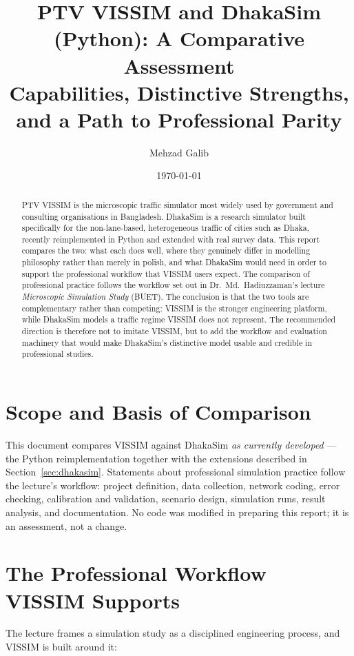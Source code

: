 \documentclass[11pt,a4paper]{article}
\title{\textbf{PTV VISSIM and DhakaSim (Python): A Comparative Assessment}\\[4pt]
\large Capabilities, Distinctive Strengths, and a Path to Professional Parity}
\author{Mehzad Galib}
\date{\today}
\begin{document}
\maketitle

\begin{abstract}
\noindent
PTV VISSIM is the microscopic traffic simulator most widely used by government and
consulting organisations in Bangladesh. DhakaSim is a research simulator built
specifically for the non-lane-based, heterogeneous traffic of cities such as Dhaka,
recently reimplemented in Python and extended with real survey data. This report
compares the two: what each does well, where they genuinely differ in modelling
philosophy rather than merely in polish, and what DhakaSim would need in order to
support the professional workflow that VISSIM users expect. The comparison of
professional practice follows the workflow set out in Dr.~Md.~Hadiuzzaman's
lecture \emph{Microscopic Simulation Study} (BUET). The conclusion is that the two
tools are complementary rather than competing: VISSIM is the stronger engineering
platform, while DhakaSim models a traffic regime VISSIM does not represent. The
recommended direction is therefore not to imitate VISSIM, but to add the workflow
and evaluation machinery that would make DhakaSim's distinctive model usable and
credible in professional studies.
\end{abstract}

\section{Scope and Basis of Comparison}
This document compares VISSIM against DhakaSim \emph{as currently developed} --- the
Python reimplementation together with the extensions described in
Section~\ref{sec:dhakasim}. Statements about professional simulation practice follow
the lecture's workflow: project definition, data collection, network coding, error
checking, calibration and validation, scenario design, simulation runs, result
analysis, and documentation. No code was modified in preparing this report; it is an
assessment, not a change.

\section{The Professional Workflow VISSIM Supports}
The lecture frames a simulation study as a disciplined engineering process, and
VISSIM is built around it:
\end{document}
